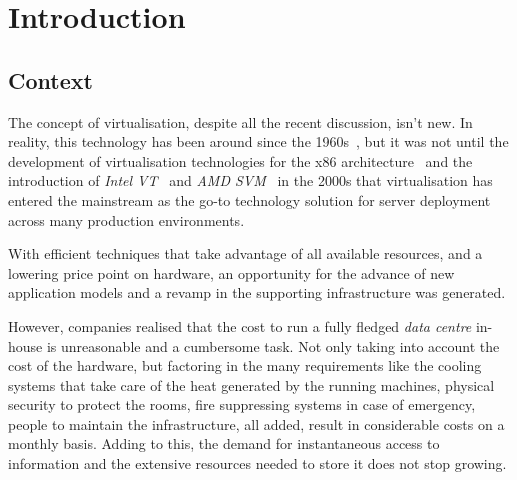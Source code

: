 \newcommand{\novathesis}{\emph{novathesis}}
\newcommand{\novathesisclass}{\texttt{novathesis.cls}}


\chapter{Introduction}
\label{cha:introduction}



\section{Context} %
\label{sec:intro_context}

The concept of virtualisation, despite all the recent discussion, isn’t new. In reality, this technology has been around since the 1960s~\cite{Buzen1973}, but it was not until the development of virtualisation technologies for the x86 architecture~\cite{Agesen2010} and the introduction of \textit{Intel VT}~\cite{Intel2010} and \textit{AMD SVM}~\cite{AMD2010} in the 2000s that virtualisation has entered the mainstream as the go-to technology solution for server deployment across many production environments. 

With efficient techniques that take advantage of all available resources, and a lowering price point on hardware, an opportunity for the advance of new application models and a revamp in the supporting infrastructure was generated. 

However, companies realised that the cost to run a fully fledged \textit{data centre} in-house is unreasonable and a cumbersome task. Not only taking into account the cost of the hardware, but factoring in the many requirements like the cooling systems that take care of the heat generated by the running machines, physical security to protect the rooms, fire suppressing systems in case of emergency, people to maintain the infrastructure, all added, result in considerable costs on a monthly basis.
Adding to this, the demand for instantaneous access to information and the extensive resources needed to store it does not stop growing.

